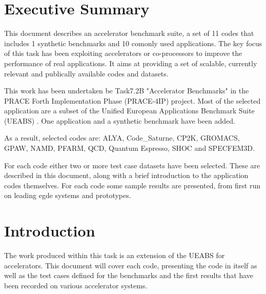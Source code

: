 \part*{Executive Summary}

This document describes an accelerator benchmark suite, a set of 11 codes that includes 1 synthetic benchmarks and 10 comonly used applications. The key focus of this task has been exploiting accelerators or co-processors to improve the performance of real applications. It aims at providing a set of scalable, currently relevant and publically available codes and datasets.

This work has been undertaken be Task7.2B "Accelerator Benchmarks" in the PRACE Forth Implementation Phase (PRACE-4IP) project.
Most of the selected application are a subset of the Unified European Applications Benchmark Suite (UEABS) \ref{}. One application and a synthetic benchmark have been added.

As a result, selected codes are: ALYA, Code\_Saturne, CP2K, GROMACS,
GPAW, NAMD, PFARM, QCD, Quantum Espresso, SHOC and SPECFEM3D.

For each code either two or more test case datasets have been selected. These are described in
this document, along with a brief introduction to the application codes themselves. For each
code some sample results are presented, from first run on leading egde systems and prototypes.



\part{Introduction}
The work produced within this task is an extension of the UEABS for accelerators. This document will cover each code, presenting the code in itself as well as the test cases defined for the benchmarks and the first results that have been recorded on various accelerator systems.

